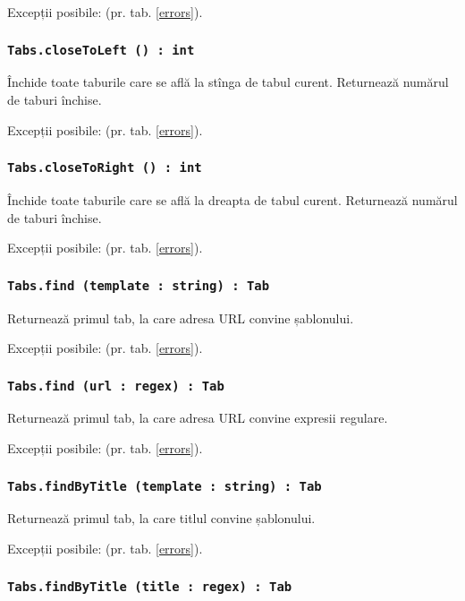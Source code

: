 Excepții posibile:  (pr. tab. \ref{errors}).

\subsubsection{\texttt{Tabs.closeToLeft () : int}}

Închide toate taburile care se află la stînga de tabul curent. Returnează numărul de taburi închise.

Excepții posibile:  (pr. tab. \ref{errors}).

\subsubsection{\texttt{Tabs.closeToRight () : int}}

Închide toate taburile care se află la dreapta de tabul curent. Returnează numărul de taburi închise.

Excepții posibile:  (pr. tab. \ref{errors}).

\subsubsection{\texttt{Tabs.find (template : string) : Tab}}

Returnează primul tab, la care adresa URL convine șablonului.

Excepții posibile:  (pr. tab. \ref{errors}).

\subsubsection{\texttt{Tabs.find (url : regex) : Tab}}

Returnează primul tab, la care adresa URL convine expresii regulare.

Excepții posibile:  (pr. tab. \ref{errors}).

\subsubsection{\texttt{Tabs.findByTitle (template : string) : Tab}}

Returnează primul tab, la care titlul convine șablonului.

Excepții posibile:  (pr. tab. \ref{errors}).

\subsubsection{\texttt{Tabs.findByTitle (title : regex) : Tab}}


